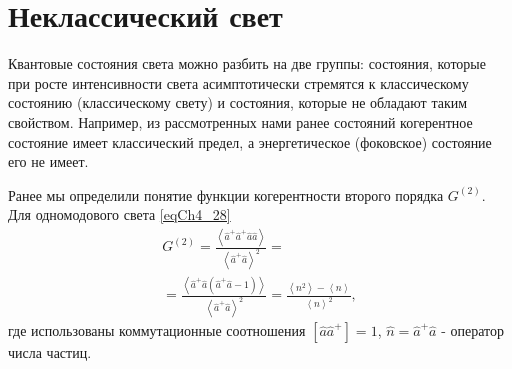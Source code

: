 \chapter{Неклассический свет}
\label{chNonClass}
Квантовые состояния света можно разбить на две группы: состояния,
которые при росте интенсивности света асимптотически стремятся к
классическому состоянию (классическому свету) и состояния, которые не
обладают таким свойством. Например, из рассмотренных нами ранее
состояний когерентное состояние имеет классический предел, а
энергетическое (фоковское) состояние его не имеет.

Ранее мы определили понятие функции когерентности второго порядка 
$G^{(2)}$. Для одномодового света \eqref{eqCh4_28}
\begin{eqnarray}
G^{(2)} = \frac{\left<\hat{a}^{+}\hat{a}^{+}\hat{a}\hat{a}\right>}
{\left<\hat{a}^{+}\hat{a}\right>^2} = 
\nonumber \\
= 
\frac{\left<\hat{a}^{+}\hat{a}\left(\hat{a}^{+}\hat{a} - 1\right)\right>}
{\left<\hat{a}^{+}\hat{a}\right>^2} = 
\frac{\left<n^2\right> - \left<n\right>}{\left<n\right>^2},
\label{eqPart3_Nonclass_Nonclass1}
\end{eqnarray}
где использованы коммутационные соотношения
$\left[\hat{a}\hat{a}^{+}\right] = 1$, 
$\hat{n} = \hat{a}^{+}\hat{a}$ - оператор числа частиц.

